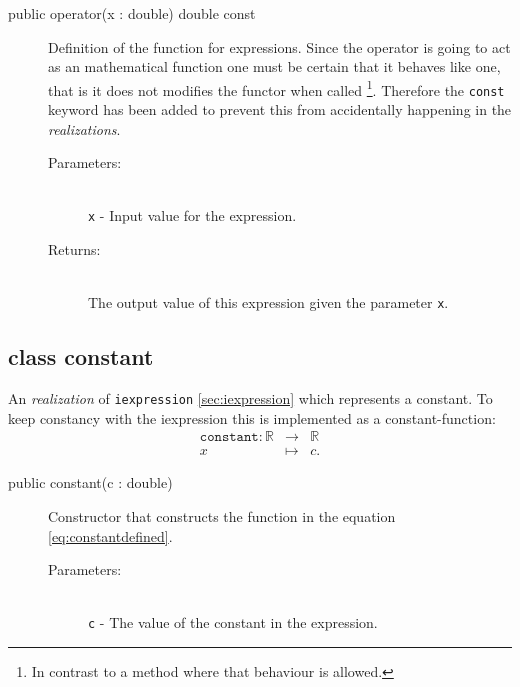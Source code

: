 \documentclass[a4paper,11pt]{kth-mag}
\newcommand{\RR}{\ensuremath{\mathbb{R}}}
\begin{document}
\begin{description}
    \item[public operator(x : double) double const] 
    Definition of the function for expressions. 
    Since the operator is going to act as an mathematical function one must be certain
    that it behaves like one, that is it does not modifies the functor when
    called \footnote{In contrast to a method where that behaviour is allowed.}.
    Therefore the \texttt{const} keyword has been added to prevent this
    from accidentally happening in the \emph{realizations}.
    \begin{description}
        \item[Parameters:]~\\
            \verb+x+ - Input value for the expression. 
        \item[Returns:]~\\
            The output value of this expression given the parameter \texttt{x}.
    \end{description}
\end{description}

\subsection{class constant} An \emph{realization} of \texttt{iexpression}
\ref{sec:iexpression} which represents a constant. To keep constancy with the
iexpression this is implemented as a constant-function:
\begin{eqnarray}
    \label{eq:constantdefined}
    \texttt{constant}: \RR &\rightarrow& \RR \nonumber \\
    x &\mapsto& c .
\end{eqnarray}
\begin{description}
    \item[public constant(c : double)] Constructor 
    that constructs the function in the equation \ref{eq:constantdefined}. 
    \begin{description}
        \item[Parameters:]~\\
            \verb+c+ - The value of the constant in the expression.
    \end{description}
\end{description}
\end{document}
